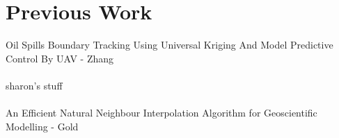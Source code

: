 
\chapter{Previous Work}
Oil Spills Boundary Tracking Using Universal Kriging
And Model Predictive Control By UAV - Zhang\\\\
sharon's stuff\\\\
An Efficient Natural Neighbour Interpolation
Algorithm for Geoscientific Modelling - Gold